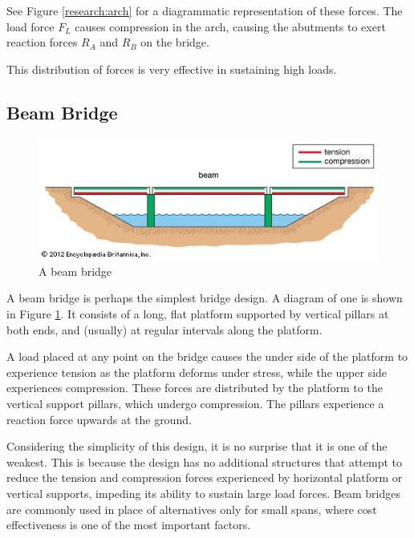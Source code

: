 \documentclass[a4paper,11pt]{article}
\begin{document}
See Figure \ref{research:arch} for a diagrammatic representation of these
forces.
The load force $F_L$ causes compression in the arch, causing the abutments to
exert reaction forces $R_A$ and $R_B$ on the bridge.

This distribution of forces is very effective in sustaining high loads.


\subsection{Beam Bridge}

\begin{figure}
\begin{center}
\includegraphics[width=\textwidth]{figures/beam.jpg}
\end{center}
\caption{A beam bridge}
\label{research:beam}
\end{figure}

A beam bridge is perhaps the simplest bridge design.
A diagram of one is shown in Figure \ref{research:beam}.
It consists of a long, flat platform supported by vertical pillars at both ends,
and (usually) at regular intervals along the platform.

A load placed at any point on the bridge causes the under side of the platform
to experience tension as the platform deforms under stress, while the upper side
experiences compression.
These forces are distributed by the platform to the vertical support pillars,
which undergo compression.
The pillars experience a reaction force upwards at the ground.

Considering the simplicity of this design, it is no surprise that it is one of
the weakest.
This is because the design has no additional structures that attempt to reduce
the tension and compression forces experienced by horizontal platform or
vertical supports, impeding its ability to sustain large load forces.
Beam bridges are commonly used in place of alternatives only for small spans,
where cost effectiveness is one of the most important factors.
\end{document}
